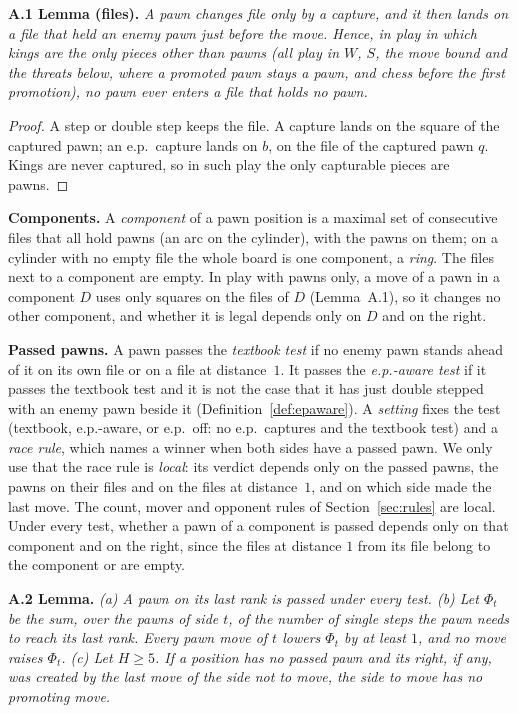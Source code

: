 \textbf{A.1 Lemma (files).} \emph{A pawn changes file only by a capture, and it then lands on a file that held an enemy
pawn just before the move. Hence, in play in which kings are the only pieces other than pawns (all play in $W$, $S$, the
move bound and the threats below, where a promoted pawn stays a pawn, and chess before the first promotion), no pawn ever
enters a file that holds no pawn.}

\begin{proof}
A step or double step keeps the file. A capture lands on the square of the captured pawn; an e.p.\ capture lands on $b$,
on the file of the captured pawn $q$. Kings are never captured, so in such play the only capturable pieces are pawns.
\end{proof}

\textbf{Components.} A \emph{component} of a pawn position is a maximal set of consecutive files that all hold pawns (an
arc on the cylinder), with the pawns on them; on a cylinder with no empty file the whole board is one component, a
\emph{ring}. The files next to a component are empty. In play with pawns only, a move of a pawn in a component $D$ uses only squares on the files
of $D$ (Lemma~A.1), so it changes no other component, and whether it is legal depends only on $D$ and on the right.

\textbf{Passed pawns.} A pawn passes the \emph{textbook test} if no enemy pawn stands ahead of it on its own file or on a
file at distance~$1$. It passes the \emph{e.p.-aware test} if it passes the textbook test and it is not the case that it
has just double stepped with an enemy pawn beside it (Definition~\ref{def:epaware}). A \emph{setting} fixes the test
(textbook, e.p.-aware, or e.p.\ off: no e.p.\ captures and the textbook test) and a \emph{race rule}, which names a winner
when both sides have a passed pawn. We only use that the race rule is \emph{local}: its verdict depends only on the passed
pawns, the pawns on their files and on the files at distance~$1$, and on which side made the last move. The count, mover and
opponent rules of Section~\ref{sec:rules} are local. Under every test, whether a pawn of a component is passed depends only
on that component and on the right, since the files at distance $1$ from its file belong to the component or are empty.

\textbf{A.2 Lemma.} \emph{(a) A pawn on its last rank is passed under every test. (b) Let $\Phi_t$ be the sum, over the
pawns of side $t$, of the number of single steps the pawn needs to reach its last rank. Every
pawn move of $t$ lowers $\Phi_t$ by at least $1$, and no move raises $\Phi_t$. (c) Let $H\ge5$. If a position has no
passed pawn and its right, if any, was created by the last move of the side not to move, the side to move has no
promoting move.}


